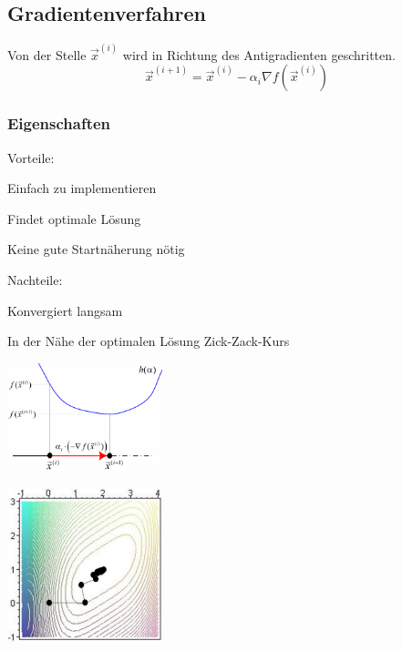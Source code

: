 \subsection{Gradientenverfahren}
  \begin{minipage}{9cm}
    Von der Stelle $\vec{x}^{(i)}$ wird in Richtung des Antigradienten geschritten. 
    $$\vec{x}^{(i+1)} = \vec{x}^{(i)} - \alpha_i \nabla f(\vec{x}^{(i)})$$
\subsubsection{Eigenschaften}    
    Vorteile:
    \begin{liste}
      \item Einfach zu implementieren
      \item Findet optimale Lösung
      \item Keine gute Startnäherung nötig
    \end{liste}
    
    Nachteile:
    \begin{liste}
      \item Konvergiert langsam
      \item In der Nähe der optimalen Lösung Zick-Zack-Kurs
    \end{liste}
  \end{minipage}
  \hfill
  \begin{minipage}{4.5cm}
    \includegraphics[width=4.5cm]{./Content/NonLinearOptimization/gradient1D}
  \end{minipage}
  \hfill
  \begin{minipage}{4.5cm}
  	\includegraphics[width=4.5cm]{./Content/NonLinearOptimization/gradient-descent}
  \end{minipage}
